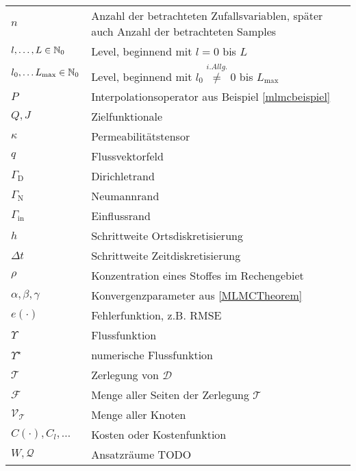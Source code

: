 \begin{tabular}[c]{ p{} p{}}
	$ n $ & Anzahl der betrachteten Zufallsvariablen, später auch Anzahl der betrachteten Samples \\
	$ l,\dots,L \in \mathbb{N}_0$ & Level, beginnend mit $ l=0 $ bis $ L $ \\
	$ l_0, \dots L_{\text{max}} \in \mathbb{N}_0 $ & Level, beginnend mit $ l_0 \stackrel{i.Allg.}{\not =} 0 $ bis $ L_{\text{max}} $  \\
	$ P $ & Interpolationsoperator aus Beispiel \ref{mlmcbeispiel} \\
	$ Q,J $ & Zielfunktionale \\
	$ \kappa $ & Permeabilitätstensor \\
	$ q $ & Flussvektorfeld \\
	$ \Gamma_{\text{D}} $ & Dirichletrand \\
	$ \Gamma_{\text{N}} $ & Neumannrand \\
	$ \Gamma_{\text{in}} $ & Einflussrand \\
	$ h $ & Schrittweite Ortsdiskretisierung \\
	$ \Delta t $ & Schrittweite Zeitdiskretisierung \\
	$ \rho $ & Konzentration eines Stoffes im Rechengebiet \\
	$ \alpha,\beta,\gamma $ & Konvergenzparameter aus \ref{MLMCTheorem} \\
	$ e(\cdot) $ & Fehlerfunktion, z.B. RMSE \\
	$ \Upsilon $ & Flussfunktion \\
	$ \Upsilon^{\star} $ & numerische Flussfunktion \\
	$ \mathcal{T} $ & Zerlegung von $ \mathcal{D} $ \\
	$ \mathcal{F} $ & Menge aller Seiten der Zerlegung $ \mathcal{T} $ \\
	$ \mathcal{V}_{\mathcal{T}} $ & Menge aller Knoten \\
	$ C(\cdot) , C_l , \dots $ & Kosten oder Kostenfunktion \\
	$ W,\mathcal{Q} $ & Ansatzräume TODO\\
	\hline
\end{tabular}

